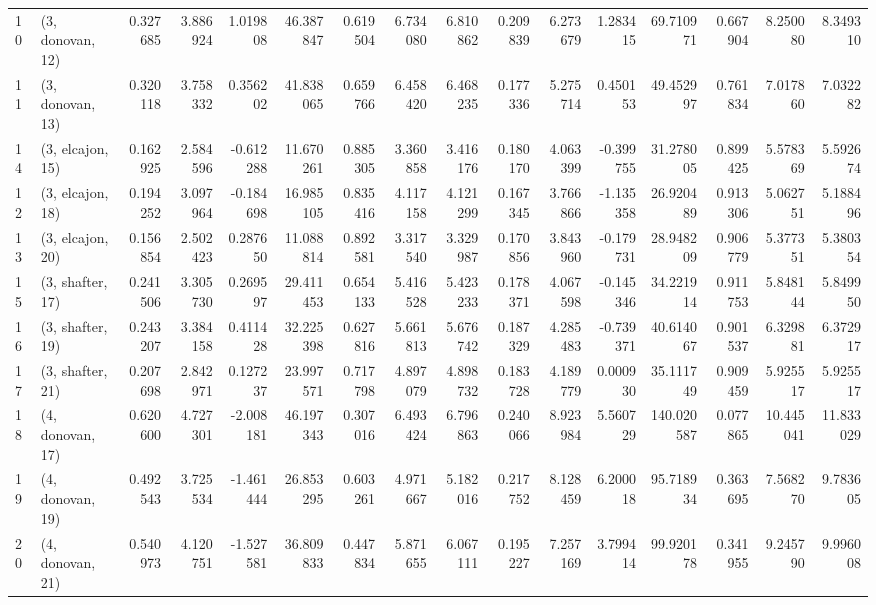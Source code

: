 \begin{tabular}{llrrrrrrrrrrrrrr}
10 &  (3, donovan, 12) &   0.327685 &  3.886924 &  1.019808 &  46.387847 &  0.619504 &   6.734080 &  6.810862 &  0.209839 &  6.273679 &  1.283415 &   69.710971 &  0.667904 &   8.250080 &   8.349310 \\
11 &  (3, donovan, 13) &   0.320118 &  3.758332 &  0.356202 &  41.838065 &  0.659766 &   6.458420 &  6.468235 &  0.177336 &  5.275714 &  0.450153 &   49.452997 &  0.761834 &   7.017860 &   7.032282 \\
14 &  (3, elcajon, 15) &   0.162925 &  2.584596 & -0.612288 &  11.670261 &  0.885305 &   3.360858 &  3.416176 &  0.180170 &  4.063399 & -0.399755 &   31.278005 &  0.899425 &   5.578369 &   5.592674 \\
12 &  (3, elcajon, 18) &   0.194252 &  3.097964 & -0.184698 &  16.985105 &  0.835416 &   4.117158 &  4.121299 &  0.167345 &  3.766866 & -1.135358 &   26.920489 &  0.913306 &   5.062751 &   5.188496 \\
13 &  (3, elcajon, 20) &   0.156854 &  2.502423 &  0.287650 &  11.088814 &  0.892581 &   3.317540 &  3.329987 &  0.170856 &  3.843960 & -0.179731 &   28.948209 &  0.906779 &   5.377351 &   5.380354 \\
15 &  (3, shafter, 17) &   0.241506 &  3.305730 &  0.269597 &  29.411453 &  0.654133 &   5.416528 &  5.423233 &  0.178371 &  4.067598 & -0.145346 &   34.221914 &  0.911753 &   5.848144 &   5.849950 \\
16 &  (3, shafter, 19) &   0.243207 &  3.384158 &  0.411428 &  32.225398 &  0.627816 &   5.661813 &  5.676742 &  0.187329 &  4.285483 & -0.739371 &   40.614067 &  0.901537 &   6.329881 &   6.372917 \\
17 &  (3, shafter, 21) &   0.207698 &  2.842971 &  0.127237 &  23.997571 &  0.717798 &   4.897079 &  4.898732 &  0.183728 &  4.189779 &  0.000930 &   35.111749 &  0.909459 &   5.925517 &   5.925517 \\
18 &  (4, donovan, 17) &   0.620600 &  4.727301 & -2.008181 &  46.197343 &  0.307016 &   6.493424 &  6.796863 &  0.240066 &  8.923984 &  5.560729 &  140.020587 &  0.077865 &  10.445041 &  11.833029 \\
19 &  (4, donovan, 19) &   0.492543 &  3.725534 & -1.461444 &  26.853295 &  0.603261 &   4.971667 &  5.182016 &  0.217752 &  8.128459 &  6.200018 &   95.718934 &  0.363695 &   7.568270 &   9.783605 \\
20 &  (4, donovan, 21) &   0.540973 &  4.120751 & -1.527581 &  36.809833 &  0.447834 &   5.871655 &  6.067111 &  0.195227 &  7.257169 &  3.799414 &   99.920178 &  0.341955 &   9.245790 &   9.996008 \\

\end{tabular}
